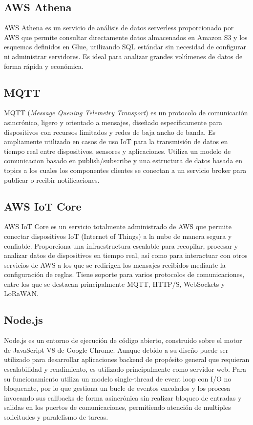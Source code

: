 \subsection{AWS Athena}

AWS Athena \citep{aws_athena} es un servicio de análisis de datos serverless proporcionado por AWS que permite consultar directamente datos almacenados en Amazon S3 y los esquemas definidos en Glue, utilizando SQL estándar sin necesidad de configurar ni administrar servidores. Es ideal para analizar grandes volúmenes de datos de forma rápida y económica.



\subsection{MQTT}

MQTT (\textit{Message Queuing Telemetry Transport}) \citep{mqtt_spec} es un protocolo de comunicación asincrónico, ligero y orientado a mensajes, diseñado específicamente para dispositivos con recursos limitados y redes de baja ancho de banda. Es ampliamente utilizado en casos de uso IoT para la transmisión de datos en tiempo real entre dispositivos, sensores y aplicaciones. Utiliza un modelo de comunicacion basado en publish/subscribe y una estructura de datos basada en topics a los cuales los componentes clientes se conectan a un servicio broker para publicar o recibir notificaciones. 

\subsection{AWS IoT Core}

AWS IoT Core \citep{aws_iot_core} es un servicio totalmente administrado de AWS que permite conectar dispositivos IoT (Internet of Things) a la nube de manera segura y confiable. Proporciona una infraestructura escalable para recopilar, procesar y analizar datos de dispositivos en tiempo real, así como para interactuar con otros servicios de AWS a los que se redirigen los mensajes recibidos mediante la configuración de reglas. Tiene soporte para varios protocolos de comunicaciones, entre los que se destacan principalmente MQTT, HTTP/S, WebSockets y LoRaWAN.

\subsection{Node.js}

Node.js \citep{nodejs} es un entorno de ejecución de código abierto, construido sobre el motor de JavaScript V8 de Google Chrome. Aunque debido a su diseño puede ser utilizado para desarrollar aplicaciones backend de propósito general que requieran escalabilidad y rendimiento, es utilizado principalmente como servidor web. Para su funcionamiento utiliza un modelo single-thread de event loop con I/O no bloqueante, por lo que gestiona un bucle de eventos encolados y los procesa invocando sus callbacks de forma asincrónica sin realizar bloqueo de entradas y salidas en los puertos de comunicaciones, permitiendo atención de multiples solicitudes y paralelismo de tareas.

